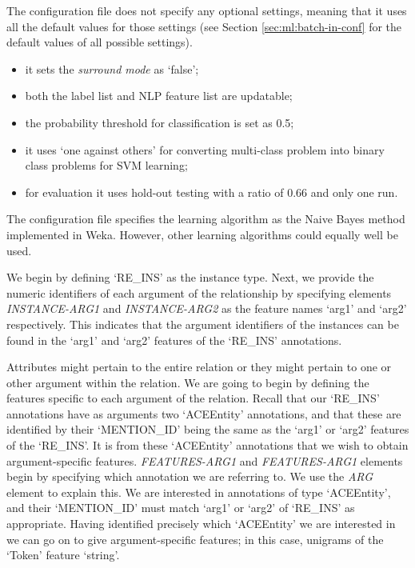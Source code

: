 The configuration file does not
 specify any optional settings, meaning that it uses all the default values for
 those settings (see Section \ref{sec:ml:batch-in-conf} for the default values of all
 possible settings).
 
\begin{itemize}
\item it sets the {\em surround mode} as `false';
\item both the label list and NLP feature list are updatable;
\item the probability threshold for classification is set as 0.5;
\item it uses `one against others' for converting multi-class
problem into binary class problems for SVM learning;
\item for evaluation it uses hold-out testing with a ratio of 0.66 and only
one run.
\end{itemize}

The configuration file specifies the learning algorithm as the Naive Bayes method
implemented in Weka. However, other learning algorithms could equally well be
used.

We begin by defining `RE\_INS' as the instance type. Next, we provide the
numeric identifiers of each argument of the relationship by specifying elements
{\em INSTANCE-ARG1} and {\em INSTANCE-ARG2} as the feature names `arg1' and
`arg2' respectively. This indicates that the argument identifiers of the
instances can be found in the `arg1' and `arg2' features of the `RE\_INS'
annotations.

Attributes might pertain to the entire relation or they might pertain to one or
other argument within the relation. We are going to begin by defining the
features specific to each argument of the relation. Recall that our `RE\_INS'
annotations have as arguments two `ACEEntity' annotations, and that these are
identified by their `MENTION\_ID' being the same as the `arg1' or `arg2'
features of the `RE\_INS'. It is from these `ACEEntity' annotations that we
wish to obtain argument-specific features. {\em FEATURES-ARG1} and {\em
FEATURES-ARG1} elements begin by specifying which annotation we are referring to.
We use the {\em ARG} element to explain this. We are interested in annotations of
type `ACEEntity', and their `MENTION\_ID' must match `arg1' or `arg2' of
`RE\_INS' as appropriate. Having identified precisely which `ACEEntity' we
are interested in we can go on to give argument-specific features; in this case,
unigrams of the `Token' feature `string'.

